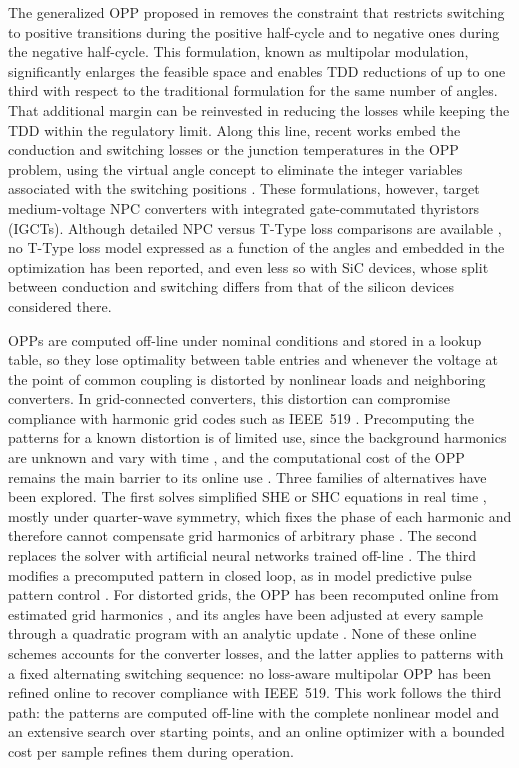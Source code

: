 \documentclass[conference]{IEEEtran}
\begin{document}
The generalized OPP proposed in \cite{birth_genopp} removes the constraint that
restricts switching to positive transitions during the positive half-cycle and
to negative ones during the negative half-cycle. This formulation, known as
multipolar modulation, significantly enlarges the feasible space and enables TDD
reductions of up to one third with respect to the traditional formulation for
the same number of angles. That additional margin can be reinvested in reducing
the losses while keeping the TDD within the regulatory limit. Along this line,
recent works embed the conduction and switching losses
\cite{koukoula_ecce23,geyer_bounded} or the junction temperatures
\cite{dorfling_thermal,koukoula_junction} in the OPP problem, using the
virtual angle concept \cite{perez_basante_hws} to eliminate the integer
variables associated with the switching positions \cite{koukoula_junction}.
These formulations, however, target medium-voltage NPC converters with
integrated gate-commutated thyristors (IGCTs). Although detailed NPC versus
T-Type loss comparisons are available \cite{lee_npc_ttype,alemi_ttype}, no
T-Type loss model expressed as a function of the angles and embedded in the
optimization has been reported, and even less so with SiC devices, whose
split between conduction and switching differs from that of the silicon
devices considered there.

OPPs are computed off-line under nominal conditions and stored in a lookup
table, so they lose optimality between table entries and whenever the
voltage at the point of common coupling is distorted by nonlinear loads and
neighboring converters. In grid-connected converters, this distortion can
compromise compliance with harmonic grid codes such as IEEE~519
\cite{ieee519}. Precomputing the patterns for a known distortion
\cite{rahmanpour_distorted} is of limited use, since the background
harmonics are unknown and vary with time \cite{david_aggr}, and the
computational cost of the OPP remains the main barrier to its online use
\cite{zhang_hpm}. Three families of alternatives have been explored. The
first solves simplified SHE or SHC equations in real time
\cite{yang_rt,buccella_recursive}, mostly under quarter-wave symmetry, which
fixes the phase of each harmonic and therefore cannot compensate grid
harmonics of arbitrary phase \cite{tsekouras_tpel}. The second replaces the
solver with artificial neural networks trained off-line
\cite{filho_ann,ibanez_ann}. The third modifies a precomputed pattern in
closed loop, as in model predictive pulse pattern control
\cite{geyer_mp3c,dorfling_gp3c}. For distorted grids, the OPP has been
recomputed online from estimated grid harmonics \cite{tsekouras_ecce}, and
its angles have been adjusted at every sample through a quadratic program
with an analytic update \cite{tsekouras_tpel}. None of these online schemes
accounts for the converter losses, and the latter applies to patterns with a
fixed alternating switching sequence: no loss-aware multipolar OPP has been
refined online to recover compliance with IEEE~519. This work follows the
third path: the patterns are computed off-line with the complete nonlinear
model and an extensive search over starting points, and an online optimizer
with a bounded cost per sample refines them during operation.
\end{document}
